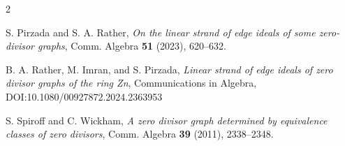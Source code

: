 \documentclass[12pt,amscd]{amsart}
\theoremstyle{definition}
\numberwithin{equation}{section}
\begin{document}
\begin{thebibliography}{2}
 
S. Pirzada and S. A. Rather, 
 {\em On the linear strand of edge ideals of some zero-divisor graphs}, Comm. Algebra {\bf 51} (2023), 620--632.
 


B. A. Rather, M. Imran, and S. Pirzada,  
{\it Linear strand of edge ideals of zero divisor graphs of the ring Zn}, Communications in Algebra, DOI:10.1080/00927872.2024.2363953


S. Spiroff and C. Wickham,
{\em A zero divisor graph determined by equivalence classes of zero divisors}, Comm. Algebra {\bf 39} (2011), 2338--2348.
 
\end{thebibliography}
\end{document}
